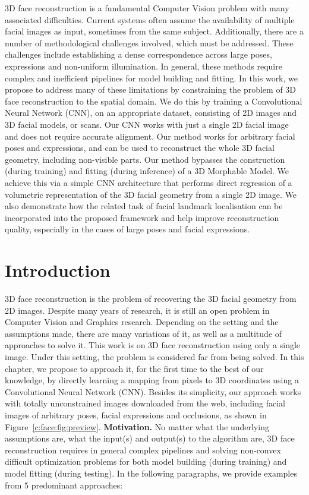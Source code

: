3D face reconstruction is a fundamental Computer Vision problem with
many associated difficulties. Current systems often assume the
availability of multiple facial images as input, sometimes from the
same subject. Additionally, there are a number of methodological
challenges involved, which must be addressed. These challenges include
establishing a dense correspondence across large poses, expressions
and non-uniform illumination. In general, these methods require
complex and inefficient pipelines for model building and fitting. In
this work, we propose to address many of these limitations by
constraining the problem of 3D face reconstruction to the spatial
domain. We do this by training a Convolutional Neural Network (CNN),
on an appropriate dataset, consisting of 2D images and 3D facial
models, or scans. Our CNN works with just a single 2D facial image and
does not require accurate alignment. Our method works for arbitrary
facial poses and expressions, and can be used to reconstruct the whole
3D facial geometry, including non-visible parts. Our method bypasses
the construction (during training) and fitting (during inference) of a
3D Morphable Model. We achieve this via a simple CNN architecture that
performs direct regression of a volumetric representation of the 3D
facial geometry from a single 2D image. We also demonstrate how the
related task of facial landmark localisation can be incorporated into
the proposed framework and help improve reconstruction quality,
especially in the cases of large poses and facial expressions.


\section{Introduction}
3D face reconstruction is the problem of recovering the 3D facial
geometry from 2D images. Despite many years of research, it is still
an open problem in Computer Vision and Graphics research. Depending on
the setting and the assumptions made, there are many variations of it,
as well as a multitude of approaches to solve it. This work is on 3D
face reconstruction using only a single image. Under this setting, the
problem is considered far from being solved. In this chapter, we
propose to approach it, for the first time to the best of our
knowledge, by directly learning a mapping from pixels to 3D
coordinates using a Convolutional Neural Network (CNN). Besides its
simplicity, our approach works with totally unconstrained images
downloaded from the web, including facial images of arbitrary poses,
facial expressions and occlusions, as shown in
Figure~\ref{c:face:fig:preview}. \newline \textbf{Motivation.} No
matter what the underlying assumptions are, what the input(s) and
output(s) to the algorithm are, 3D face reconstruction requires in
general complex pipelines and solving non-convex difficult
optimization problems for both model building (during training) and
model fitting (during testing). In the following paragraphs, we provide
examples from 5 predominant approaches:

